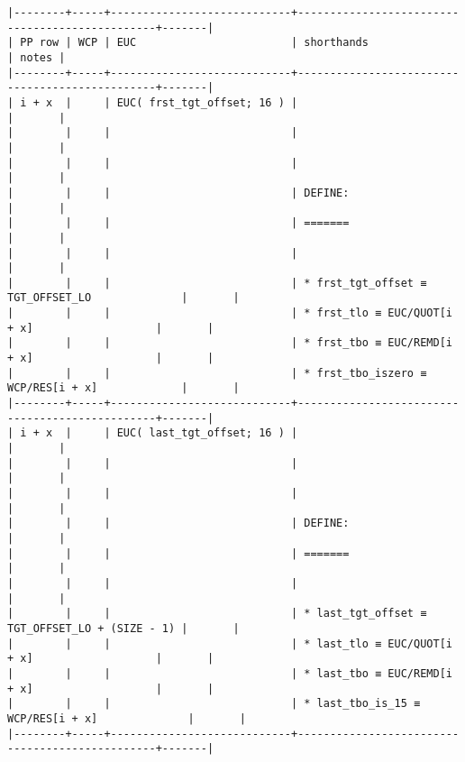 \documentclass[varwidth=\maxdimen,margin=0.5cm,multi={verbatim}]{standalone}
\begin{document}
\begin{verbatim}
|--------+-----+----------------------------+------------------------------------------------+-------|
| PP row | WCP | EUC                        | shorthands                                     | notes |
|--------+-----+----------------------------+------------------------------------------------+-------|
| i + x  |     | EUC( frst_tgt_offset; 16 ) |                                                |       |
|        |     |                            |                                                |       |
|        |     |                            |                                                |       |
|        |     |                            | DEFINE:                                        |       |
|        |     |                            | =======                                        |       |
|        |     |                            |                                                |       |
|        |     |                            | * frst_tgt_offset ≡ TGT_OFFSET_LO              |       |
|        |     |                            | * frst_tlo ≡ EUC/QUOT[i + x]                   |       |
|        |     |                            | * frst_tbo ≡ EUC/REMD[i + x]                   |       |
|        |     |                            | * frst_tbo_iszero ≡ WCP/RES[i + x]             |       |
|--------+-----+----------------------------+------------------------------------------------+-------|
| i + x  |     | EUC( last_tgt_offset; 16 ) |                                                |       |
|        |     |                            |                                                |       |
|        |     |                            |                                                |       |
|        |     |                            | DEFINE:                                        |       |
|        |     |                            | =======                                        |       |
|        |     |                            |                                                |       |
|        |     |                            | * last_tgt_offset ≡ TGT_OFFSET_LO + (SIZE - 1) |       |
|        |     |                            | * last_tlo ≡ EUC/QUOT[i + x]                   |       |
|        |     |                            | * last_tbo ≡ EUC/REMD[i + x]                   |       |
|        |     |                            | * last_tbo_is_15 ≡ WCP/RES[i + x]              |       |
|--------+-----+----------------------------+------------------------------------------------+-------|


\end{verbatim}
\end{document}
